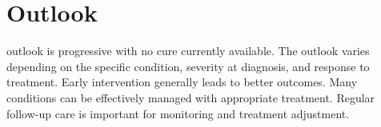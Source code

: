 \section{Outlook}
outlook is progressive with no cure currently available. The outlook varies depending on the specific condition, severity at diagnosis, and response to treatment. Early intervention generally leads to better outcomes. Many conditions can be effectively managed with appropriate treatment. Regular follow-up care is important for monitoring and treatment adjustment.
